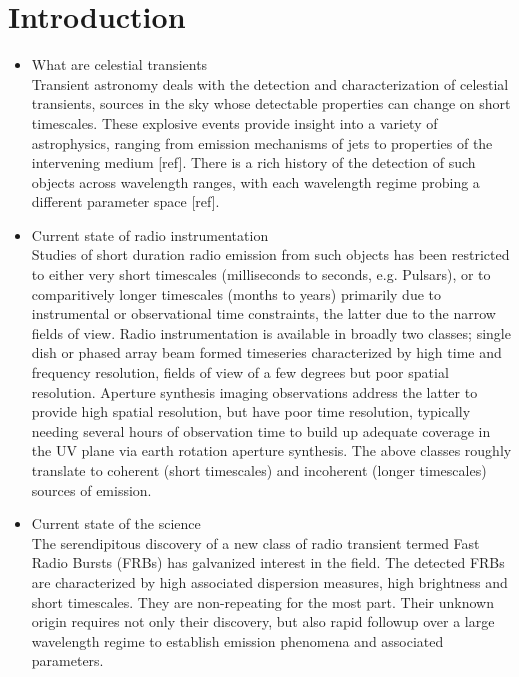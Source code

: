 \documentclass{aa}
\begin{document}

\maketitle

\section{\label{sec:Introduction}Introduction}

\begin{itemize}
\item What are celestial transients \\
Transient astronomy deals  with the detection and  characterization of celestial
transients, sources in  the sky whose detectable properties can  change on short
timescales.   These  explosive   events  provide  insight  into   a  variety  of
astrophysics,  ranging from  emission mechanisms  of jets  to properties  of the
intervening  medium [ref].  There is  a rich  history of  the detection  of such
objects  across  wavelength  ranges,  with  each  wavelength  regime  probing  a
different parameter space [ref].

\item Current  state of  radio instrumentation\\
Studies of short  duration radio emission from such objects  has been restricted
to either very  short timescales (milliseconds to seconds, e.g.  Pulsars), or to
comparitively longer timescales (months to  years) primarily due to instrumental
or observational time constraints, the latter  due to the narrow fields of view.
Radio instrumentation is available in broadly two classes; single dish or phased
array  beam  formed   timeseries  characterized  by  high   time  and  frequency
resolution,  fields of  view  of  a few  degrees  but  poor spatial  resolution.
Aperture  synthesis imaging  observations  address the  latter  to provide  high
spatial resolution,  but have  poor time  resolution, typically  needing several
hours of  observation time  to build up  adequate coverage in  the UV  plane via
earth  rotation aperture  synthesis.   The above  classes  roughly translate  to
coherent  (short  timescales)  and  incoherent (longer  timescales)  sources  of
emission.

\item Current state of the science \\
The serendipitous discovery of a new  class of radio transient termed Fast Radio
Bursts  (FRBs) has  galvanized  interest in  the field.  The  detected FRBs  are
characterized by high associated dispersion  measures, high brightness and short
timescales.  They are  non-repeating for  the  most part.  Their unknown  origin
requires  not  only their  discovery,  but  also  rapid  followup over  a  large
wavelength regime to establish emission phenomena and associated parameters.


\end{itemize}
\end{document}
